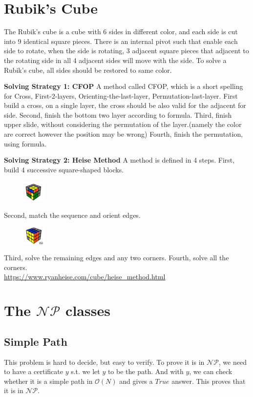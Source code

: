 \documentclass[A4paper]{article}
\begin{document}
\section{Rubik's Cube}
The Rubik's cube is a cube with 6 sides in different color, and each side is cut into 9 identical square pieces. There is an internal pivot such that enable each side to rotate, when the side is rotating, 3 adjacent square pieces that adjacent to the rotating side in all 4 adjacent sides will move with the side. To solve a Rubik's cube, all sides should be restored to same color. \\
\par \textbf{Solving Strategy 1: CFOP} A method called CFOP, which is a short spelling for Cross, First-2-layers, Orienting-the-last-layer, Permutation-last-layer. First build a cross, on a single layer, the cross should be also valid for the adjacent for side. Second, finish the bottom two layer according to formula. Third, finish upper slide, without considering the permutation of the layer.(namely the color are correct however the position may be wrong) Fourth, finish the permutation, using formula.
\par \textbf{Solving Strategy 2: Heise Method}  A method is defined in 4 steps. First, build 4 successive square-shaped blocks.
\begin{figure}[!htbp]
\centering
\includegraphics[width=0.1\textwidth]{HW3_pb1.png}
\end{figure}
\begin{flushleft}
Second, match the sequence and orient edges.
\end{flushleft}
\begin{figure}[!htbp]
\centering
\includegraphics[width=0.1\textwidth]{HW3_pb2.png}
\end{figure}
Third, solve the remaining edges and any two corners. Fourth, solve all the corners. \\
\url{https://www.ryanheise.com/cube/heise_method.html}
\section{The $\mathcal{NP}$ classes}
\subsection{Simple Path}
This problem is hard to decide, but easy to verify. To prove it is in $\mathcal{NP}$, we need to have a certificate $y$ s.t. we let $y$ to be the path. And with $y$, we can check whether it is a simple path in $\mathcal{O}(N)$ and gives a $True$ answer. This proves that it is in $\mathcal{NP}$.
\end{document}

